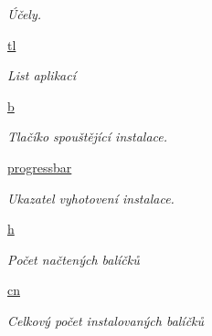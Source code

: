 \begin{DoxyCompactItemize}
\begin{DoxyCompactList}\small\item\em Účely. \end{DoxyCompactList}\item 
\hypertarget{classmnFocus_1_1App_a8f12bcadf8d094ec3c00f5c003ec963c}{\hyperlink{classmnFocus_1_1App_a8f12bcadf8d094ec3c00f5c003ec963c}{tl}}\label{db/d36/classmnFocus_1_1App_a8f12bcadf8d094ec3c00f5c003ec963c}

\begin{DoxyCompactList}\small\item\em List aplikací \end{DoxyCompactList}\item 
\hypertarget{classmnFocus_1_1App_adaafedf80722dbc5b43480b07fbfb5f9}{\hyperlink{classmnFocus_1_1App_adaafedf80722dbc5b43480b07fbfb5f9}{b}}\label{db/d36/classmnFocus_1_1App_adaafedf80722dbc5b43480b07fbfb5f9}

\begin{DoxyCompactList}\small\item\em Tlačíko spouštějící instalace. \end{DoxyCompactList}\item 
\hypertarget{classmnFocus_1_1App_a5bb738352b2df761b6315f8e400ac1f0}{\hyperlink{classmnFocus_1_1App_a5bb738352b2df761b6315f8e400ac1f0}{progressbar}}\label{db/d36/classmnFocus_1_1App_a5bb738352b2df761b6315f8e400ac1f0}

\begin{DoxyCompactList}\small\item\em Ukazatel vyhotovení instalace. \end{DoxyCompactList}\item 
\hypertarget{classmnFocus_1_1App_a894b544a9d4fca1c75b7f16b44d8a33e}{\hyperlink{classmnFocus_1_1App_a894b544a9d4fca1c75b7f16b44d8a33e}{h}}\label{db/d36/classmnFocus_1_1App_a894b544a9d4fca1c75b7f16b44d8a33e}

\begin{DoxyCompactList}\small\item\em Počet načtených balíčků \end{DoxyCompactList}\item 
\hypertarget{classmnFocus_1_1App_a6c2b18044b5b0d3bda8a1326490e93bc}{\hyperlink{classmnFocus_1_1App_a6c2b18044b5b0d3bda8a1326490e93bc}{cn}}\label{db/d36/classmnFocus_1_1App_a6c2b18044b5b0d3bda8a1326490e93bc}

\begin{DoxyCompactList}\small\item\em Celkový počet instalovaných balíčků \end{DoxyCompactList}\end{DoxyCompactItemize}


